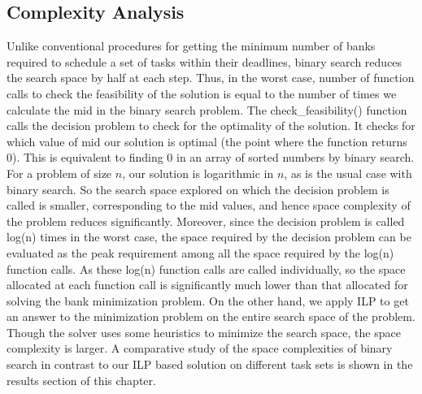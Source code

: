 \subsection{Complexity Analysis}\label{cabs}
Unlike conventional procedures for getting the minimum number of banks required to schedule a set of tasks within their 
deadlines, binary search reduces the search space by half at each step. Thus, in the worst case, number of function calls to 
check the feasibility of the solution is equal to the number of times we calculate the mid in the binary search problem. The 
check\_feasibility() function calls the decision problem to check for the optimality of the solution. It checks for which 
value of mid our solution is optimal (the point where the function returns 0). This is equivalent to finding 0 in an array of 
sorted numbers by binary search. For a problem of size $n$, our solution is logarithmic in $n$, as is the usual case with binary search. 
So the search space explored on which the decision problem is called is smaller, corresponding to the mid 
values, and hence space complexity of the problem reduces significantly. Moreover, since the decision problem is called 
log(n) times in the worst case, the space required by the decision problem can be evaluated as the peak requirement among all the space 
required by the log(n) function calls. As these log(n) function calls are called individually, so the space allocated at each 
function call is significantly much lower than that allocated for solving the bank minimization problem. On the other hand, we apply ILP to get an answer to the minimization problem on the entire search space of the problem. 
Though the solver uses some heuristics to minimize the search space, the space complexity is larger.
A comparative study of the space complexities of binary search in contrast to our ILP based solution on different task sets is 
shown in the results section of this chapter.


